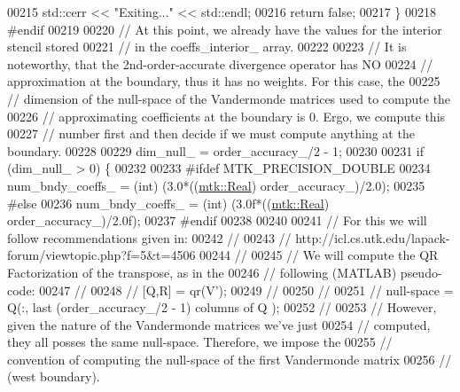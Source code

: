 \begin{DoxyCode}
00215     std::cerr << \textcolor{stringliteral}{"Exiting..."} << std::endl;
00216     \textcolor{keywordflow}{return} \textcolor{keyword}{false};
00217   \}
00218 \textcolor{preprocessor}{  #endif}
00219 
00220   \textcolor{comment}{// At this point, we already have the values for the interior stencil stored}
00221   \textcolor{comment}{// in the coeffs\_interior\_ array.}
00222 
00223   \textcolor{comment}{// It is noteworthy, that the 2nd-order-accurate divergence operator has NO}
00224   \textcolor{comment}{// approximation at the boundary, thus it has no weights. For this case, the}
00225   \textcolor{comment}{// dimension of the null-space of the Vandermonde matrices used to compute the}
00226   \textcolor{comment}{// approximating coefficients at the boundary is 0. Ergo, we compute this}
00227   \textcolor{comment}{// number first and then decide if we must compute anything at the boundary.}
00228 
00229   dim\_null\_ = order\_accuracy\_/2 - 1;
00230 
00231   \textcolor{keywordflow}{if} (dim\_null\_ > 0) \{
00232 
00233 \textcolor{preprocessor}{    #ifdef MTK\_PRECISION\_DOUBLE}
00234     num\_bndy\_coeffs\_ = (int) (3.0*((\hyperlink{group__c01-roots_gac080bbbf5cbb5502c9f00405f894857d}{mtk::Real}) order\_accuracy\_)/2.0);
00235 \textcolor{preprocessor}{    #else}
00236     num\_bndy\_coeffs\_ = (int) (3.0f*((\hyperlink{group__c01-roots_gac080bbbf5cbb5502c9f00405f894857d}{mtk::Real}) order\_accuracy\_)/2.0f);
00237 \textcolor{preprocessor}{    #endif}
00238 
00240 
00241     \textcolor{comment}{// For this we will follow recommendations given in:}
00242     \textcolor{comment}{//}
00243     \textcolor{comment}{// http://icl.cs.utk.edu/lapack-forum/viewtopic.php?f=5&t=4506}
00244     \textcolor{comment}{//}
00245     \textcolor{comment}{// We will compute the QR Factorization of the transpose, as in the}
00246     \textcolor{comment}{// following (MATLAB) pseudo-code:}
00247     \textcolor{comment}{//}
00248     \textcolor{comment}{// [Q,R] = qr(V'); %
00249     \textcolor{comment}{// %
00250     \textcolor{comment}{//}
00251     \textcolor{comment}{// null-space = Q(:, last (order\_accuracy\_/2 - 1) columns of Q );}
00252     \textcolor{comment}{//}
00253     \textcolor{comment}{// However, given the nature of the Vandermonde matrices we've just}
00254     \textcolor{comment}{// computed, they all posses the same null-space. Therefore, we impose the}
00255     \textcolor{comment}{// convention of computing the null-space of the first Vandermonde matrix}
00256     \textcolor{comment}{// (west boundary).}
}}
\end{DoxyCode}

